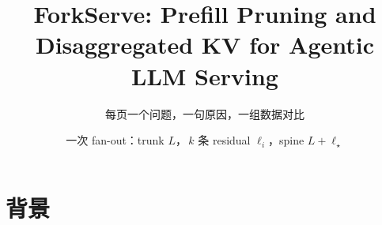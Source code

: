 \documentclass[aspectratio=169,10pt]{ctexbeamer}
\title{ForkServe: Prefill Pruning and\\ Disaggregated KV for Agentic LLM Serving}
\subtitle{每页一个问题，一句原因，一组数据对比}
\author{一次 fan-out：trunk $L$，\,$k$ 条 residual $\ell_i$，spine $L{+}\ell_\star$}
\date{}
\newcommand{\why}[1]{{\small\textbf{\color{fsgreen}原因.}\ #1}\par\vspace{0.45em}}
\begin{document}
\begin{frame}
  \vfill
  \begin{center}
    {\Large\bfseries\inserttitle\par}
  \end{center}
  \vfill
\end{frame}



\section{背景}

\end{document}
